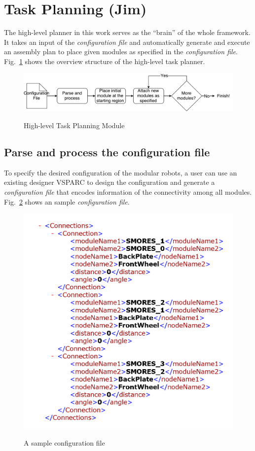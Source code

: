\section{Task Planning (Jim)}

The high-level planner in this work serves as the ``brain'' of the whole framework.
It takes an input of the {\it configuration file} and automatically generate and execute an assembly plan to place given modules as specified in the {\it configuration file}.
Fig.~\ref{fig:taskplan} shows the overview structure of the high-level task planner.

\begin{figure}[ht!]%
\centering
{\includegraphics[width=0.95\columnwidth]{pics/highlevelflow.pdf}}
\caption{High-level Task Planning Module}
\label{fig:taskplan}
\end{figure}

\subsection{Parse and process the configuration file}
To specify the desired configuration of the modular robots, a user can use an existing designer VSPARC \cite{vsparc} to design the configuration and generate a {\it configuration file} that encodes information of the connectivity among all modules.
Fig.~\ref{fig:configfile} shows an sample {\it configuration file}.

\begin{figure}[ht!]%
\centering
{\includegraphics[width=0.95\columnwidth]{pics/configfile.png}}
\caption{A sample configuration file}
\label{fig:configfile}
\end{figure}

